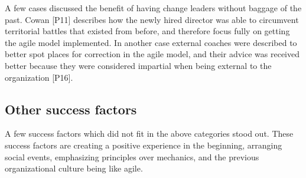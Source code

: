 
A few cases discussed the benefit of having change leaders without baggage of
the past. Cowan [P11] describes how the newly hired director was able to
circumvent territorial battles that existed from before, and therefore focus
fully on getting the agile model implemented. In another case external coaches
were described to better spot places for correction in the agile model, and
their advice was received better because they were considered impartial when
being external to the organization [P16].


% 
% 
% 
% 
% 


\subsection{Other success factors}

A few success factors which did not fit in the above categories stood out. These
success factors are creating a positive experience in the beginning, arranging
social events, emphasizing principles over mechanics, and the previous
organizational culture being like agile.


